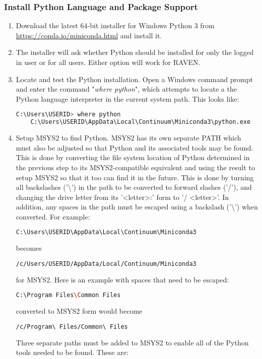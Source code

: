 \subsubsection{Install Python Language and Package Support}
\begin{enumerate}
	\item Download the latest 64-bit installer for Windows Python 3 from
		\url{https://conda.io/miniconda.html} and install it.  \item The installer
		will ask whether Python should be installed for only the logged in user or
		for all users.  Either option will work for RAVEN.
	\item Locate and test the Python installation.   Open a Windows command prompt and enter the
		command "{\it where python}", which attempts to locate a the Python language interpreter
		in the current system path.  This looks like:

    \begin{lstlisting}[language=bash, basicstyle=\small]
    C:\Users\USERID> where python
    C:\Users\USERID\AppData\Local\Continuum\Miniconda3\python.exe
    \end{lstlisting}

	\item Setup MSYS2 to find Python.  MSYS2 has its own separate PATH which must also be adjusted
		so that Python and its associated tools may be found. This is done by converting the
		file system location of Python determined in the previous step to its MSYS2-compatible
		equivalent and using the result to setup MSYS2 so that it too can find it in the future.
		\newline \newline
		This is done by turning all backslashes ('\textbackslash') in the path to be converted to
		forward slashes ('/'), and changing the drive letter from its '\textless letter\textgreater:'
		form to '/ \textless letter\textgreater'. In addition, any spaces in the path must
		be escaped using a backslash ('\textbackslash') when converted.
		\newline \newline
		For example:

\begin{lstlisting}[language=bash]
C:\Users\USERID\AppData\Local\Continuum\Miniconda3
\end{lstlisting}
		becomes
\begin{lstlisting}[language=bash]
/c/Users/USERID/AppData/Local/Continuum/Miniconda3
\end{lstlisting}
		for MSYS2. Here is an example with spaces that need to be escaped:
\begin{lstlisting}[language=bash]
C:\Program Files\Common Files
\end{lstlisting}
		converted to MSYS2 form would become
\begin{lstlisting}[language=bash]
/c/Program\ Files/Common\ Files
\end{lstlisting}
		\medskip
		Three separate paths must be added to MSYS2 to enable all of the Python tools needed
		to be found.  These are:


\end{enumerate}
